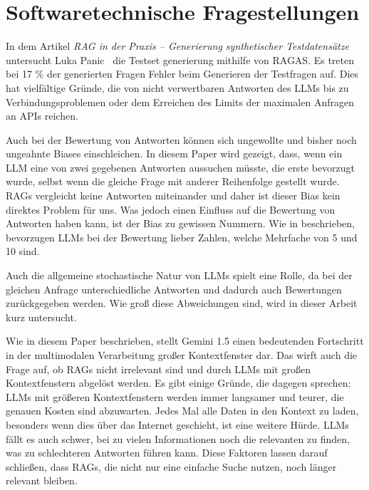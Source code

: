 \section{Softwaretechnische Fragestellungen}

In dem Artikel \textit{RAG in der Praxis – Generierung synthetischer Testdatensätze} untersucht Luka Panic~\cite{pixion2024rag} die Testset generierung mithilfe von RAGAS. Es treten bei 17 \% der generierten Fragen Fehler beim Generieren der Testfragen auf.
Dies hat vielfältige Gründe, die von nicht verwertbaren Antworten des LLMs bis zu Verbindungsproblemen oder dem Erreichen des Limits der maximalen Anfragen an APIs reichen.

Auch bei der Bewertung von Antworten können sich ungewollte und bisher noch ungeahnte Biases einschleichen. In diesem Paper \cite{yang2023llmfairness} wird gezeigt, dass, wenn ein LLM eine von zwei gegebenen Antworten aussuchen müsste, die erste bevorzugt wurde, selbst wenn die gleiche Frage mit anderer Reihenfolge gestellt wurde.
RAGs vergleicht keine Antworten miteinander und daher ist dieser Bias kein direktes Problem für uns. Was jedoch einen Einfluss auf die Bewertung von Antworten haben kann, ist der Bias zu gewissen Nummern.
Wie in \cite{shaikh2024cbeval} beschrieben, bevorzugen LLMs bei der Bewertung lieber Zahlen, welche Mehrfache von 5 und 10 sind.

Auch die allgemeine stochastische Natur von LLMs spielt eine Rolle, da bei der gleichen Anfrage unterschiedliche Antworten und dadurch auch Bewertungen zurückgegeben werden. Wie groß diese Abweichungen sind, wird in dieser Arbeit kurz untersucht.

Wie in diesem Paper \cite{gemini2024v15} beschrieben, stellt Gemini 1.5 einen bedeutenden Fortschritt in der multimodalen Verarbeitung großer Kontextfenster dar. Das wirft auch die Frage auf, ob RAGs nicht irrelevant sind und durch LLMs mit großen Kontextfenstern abgelöst werden.
Es gibt einige Gründe, die dagegen sprechen: LLMs mit größeren Kontextfenstern werden immer langsamer und teurer, die genauen Kosten sind abzuwarten. Jedes Mal alle Daten in den Kontext zu laden, besonders wenn dies über das Internet geschieht, ist eine weitere Hürde. LLMs fällt es auch schwer, bei zu vielen Informationen noch die relevanten zu finden, was zu schlechteren Antworten führen kann.
Diese Faktoren lassen darauf schließen, dass RAGs, die nicht nur eine einfache Suche nutzen, noch länger relevant bleiben.


